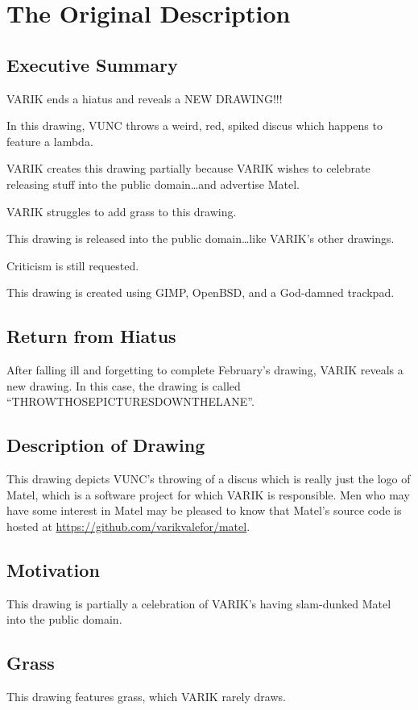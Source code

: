 \documentclass{report}
\begin{document}
\section{The Original Description}
\subsection{Executive Summary}
VARIK ends a hiatus and reveals a NEW DRAWING!!!

In this drawing, VUNC throws a weird, red, spiked discus which happens to feature a lambda.

VARIK creates this drawing partially because VARIK wishes to celebrate releasing stuff into the public domain\ldots and advertise Matel.

VARIK struggles to add grass to this drawing.

This drawing is released into the public domain\ldots like VARIK's other drawings.

Criticism is still requested.

This drawing is created using GIMP, OpenBSD, and a God-damned trackpad.

\subsection{Return from Hiatus}
After falling ill and forgetting to complete February's drawing, VARIK reveals a new drawing.  In this case, the drawing is called ``THROWTHOSEPICTURESDOWNTHELANE''.

\subsection{Description of Drawing}
This drawing depicts VUNC's throwing of a discus which is really just the logo of Matel, which is a software project for which VARIK is responsible.  Men who may have some interest in Matel may be pleased to know that Matel's source code is hosted at \url{https://github.com/varikvalefor/matel}.

\subsection{Motivation}
This drawing is partially a celebration of VARIK's having slam-dunked Matel into the public domain.

\subsection{Grass}
This drawing features grass, which VARIK rarely draws.
\end{document}
